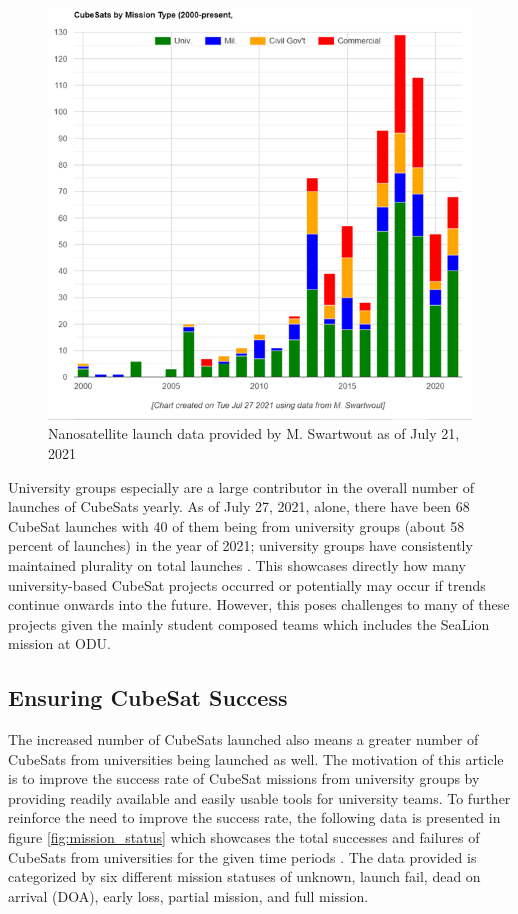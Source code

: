 \documentclass[journal,article,submit,pdftex,moreauthors]{Definitions/mdpi}
\begin{document}
\begin{figure}[H]
    \includegraphics[width=10.5 cm]{assets/launch_data.png}
    \caption{Nanosatellite launch data provided by M. Swartwout as of July 21, 2021 \cite{swartwout_data}}
	\label{fig:launch_data}
    \end{figure}
	\noindent   
\unskip

University groups especially are a large contributor in the overall number of launches of CubeSats yearly.  As of July 27, 2021, alone, there have been 68 CubeSat launches with 40 of them being from university groups (about 58 percent of launches) in the year of 2021; university groups have consistently maintained plurality on total launches \cite{swartwout_data}.  This showcases directly how many university-based CubeSat projects occurred or potentially may occur if trends continue onwards into the future.  However, this poses challenges to many of these projects given the mainly student composed teams which includes the SeaLion mission at ODU.

\subsection{Ensuring CubeSat Success}
The increased number of CubeSats launched also means a greater number of CubeSats from universities being launched as well.  The motivation of this article is to improve the success rate of CubeSat missions from university groups by providing readily available and easily usable tools for university teams.  To further reinforce the need to improve the success rate, the following data is presented in figure \ref{fig:mission_status} which showcases the total successes and failures of CubeSats from universities for the given time periods \cite{reliving_24}.  The data provided is categorized by six different mission statuses of unknown, launch fail, dead on arrival (DOA), early loss, partial mission, and full mission.
\end{document}
